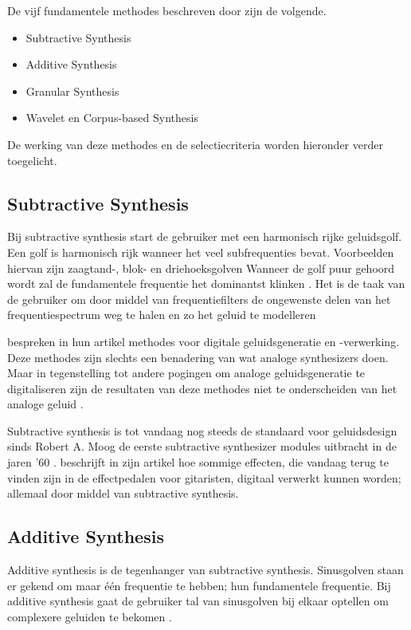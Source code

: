 De vijf fundamentele methodes beschreven door \textcite{methodes} zijn de volgende.

\begin{itemize}
    \item Subtractive Synthesis
    \item Additive Synthesis
    \item Granular Synthesis
    \item Wavelet en Corpus-based Synthesis
\end{itemize}{}

De werking van deze methodes en de selectiecriteria worden hieronder verder toegelicht.

\subsection{Subtractive Synthesis}

Bij subtractive synthesis start de gebruiker met een harmonisch rijke geluidsgolf. Een golf is harmonisch rijk wanneer het veel subfrequenties bevat. Voorbeelden hiervan zijn zaagtand-, blok- en driehoeksgolven Wanneer de golf puur gehoord wordt zal de fundamentele frequentie het dominantst klinken \autocite{harmonics}. Het is de taak van de gebruiker om door middel van frequentiefilters de ongewenste delen van het frequentiespectrum weg te halen en zo het geluid te modelleren \autocite{subtractive}

\textcite{subtractive} bespreken in hun artikel methodes voor digitale geluidsgeneratie en -verwerking. Deze methodes zijn slechts een benadering van wat analoge synthesizers doen. Maar in tegenstelling tot andere pogingen om analoge geluidsgeneratie te digitaliseren zijn de resultaten van deze methodes niet te onderscheiden van het analoge geluid \autocite{subtractive}.

Subtractive synthesis is tot vandaag nog steeds de standaard voor geluidsdesign sinds Robert A. Moog de eerste subtractive synthesizer modules uitbracht in de jaren '60 \autocite{subtractive}. \textcite{guitarpedals} beschrijft in zijn artikel hoe sommige effecten, die vandaag terug te vinden zijn in de effectpedalen voor gitaristen, digitaal verwerkt kunnen worden; allemaal door middel van subtractive synthesis.

\subsection{Additive Synthesis}

Additive synthesis is de tegenhanger van subtractive synthesis. Sinusgolven staan er gekend om maar één frequentie te hebben; hun fundamentele frequentie. Bij additive synthesis gaat de gebruiker tal van sinusgolven bij elkaar optellen om complexere geluiden te bekomen \autocite{additive}.

